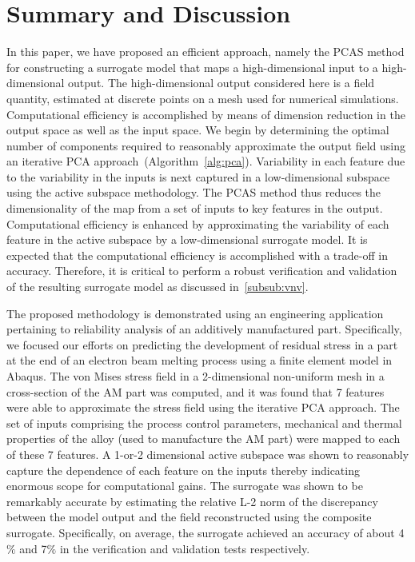 \section{Summary and Discussion}
\label{sec:conc}

In this paper, we have proposed an efficient approach, namely the PCAS method for constructing a surrogate model that 
maps a high-dimensional input to a high-dimensional output. The high-dimensional output considered here is a field quantity,
estimated at discrete points on a mesh used for numerical simulations. Computational efficiency is
accomplished by means of dimension reduction in the output space as well as the input space.
We begin by determining the optimal number of
components required to reasonably approximate the output field using an iterative PCA approach~(Algorithm~\ref{alg:pca}).
Variability in each feature due to the variability
in the inputs is next captured in a low-dimensional subspace using the active subspace methodology.
The PCAS method thus reduces the dimensionality
of the map from a set of inputs to key features in the output. Computational efficiency is enhanced by 
approximating the variability of each feature in the active subspace by a low-dimensional surrogate model.
It is expected that the computational efficiency is accomplished with a trade-off in accuracy.
Therefore, it is critical to perform a robust verification and validation of the resulting surrogate model as discussed
in~\ref{subsub:vnv}. 

The proposed methodology is demonstrated using an engineering application pertaining to reliability analysis of
an additively manufactured part. Specifically, we focused our efforts on predicting the development of residual
stress in a part at the end of an electron beam melting process using a finite element model in Abaqus.
The von Mises stress field in a 2-dimensional non-uniform mesh
in a cross-section of the AM part was computed, and it was found that
7 features were able to approximate the stress field using the iterative PCA approach. The set of inputs
comprising the process control parameters, mechanical and thermal properties of the alloy (used to manufacture the
AM part) were mapped to each of these 7 features. A 1-or-2 dimensional active subspace was shown to reasonably
capture the dependence of each feature on the inputs thereby indicating enormous scope for computational gains.
The surrogate was shown to be remarkably accurate by estimating the relative L-2 norm of the discrepancy
between the model output and the field reconstructed using the composite surrogate. Specifically, on average, the
surrogate achieved an accuracy of about 4$\%$ and 7$\%$ in the verification and validation tests respectively.

